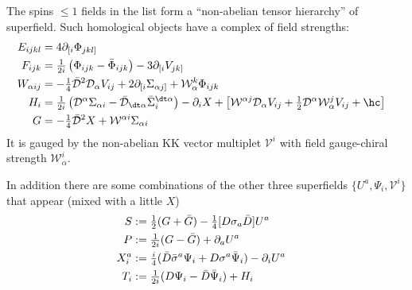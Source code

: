 \documentclass[letter,12pt]{article} %
\def\X{X}
\def\T{T}
\begin{document}
The spins $\leq 1$ fields in the list form a ``non-abelian tensor hierarchy'' of superfield.
Such homological objects have a complex of field strengths:
{%
\begin{align}
E_{ijkl} &= 4\partial_{[i} \Phi_{jkl]}
	\cr
F_{ijk} &= \tfrac1{2i}\left( \Phi_{ijk} - \bar \Phi_{ijk}\right) - 3\partial_{[i} V_{jk]}
	\cr
W_{\alpha ij} &= -\tfrac14 \bar {\mathcal D}^2 {\mathcal D}_\alpha V_{ij}
	+2\partial_{[i} \Sigma_{\alpha j]}
	+ \mathcal W_\alpha^k \Phi_{ijk}
	\cr
H_i &= \tfrac1{2i}\left({\mathcal D}^\alpha \Sigma_{\alpha i} - \bar {\mathcal D}_{\dt \alpha} \bar \Sigma_i^{\dt \alpha} \right)
	-\partial_i X 
	+\left[  \mathcal W^{\alpha j} {\mathcal D}_\alpha  V_{ij}
		+\tfrac12 {\mathcal D}^\alpha \mathcal W_\alpha^j   V_{ij}
	+\hc \right]
	\cr
G&= -\tfrac14 \bar {\mathcal D}^2 X 
	+ \mathcal W^{\alpha i} \Sigma_{\alpha	i}
\nonumber
\end{align}
}
It is gauged by the non-abelian KK vector multiplet $\mathcal V^i$ with field gauge-chiral strength $\mathcal W_\alpha^i$.

In addition there are some combinations of the other three superfields $\{U^a, \Psi_i, \mathcal V^i\}$ that appear (mixed with a little $X$)
{%
\begin{align}
S &:=\tfrac12(G+\bar G) -\tfrac14 [D \sigma_a \bar D] U^a
\cr
P &:=\tfrac 1{2i} (G-\bar G) + \partial_a U^a
\cr
\X_i^a &:= \tfrac i4 ( \bar D \bar \sigma^a \Psi_i+ D\sigma^a\bar \Psi_i ) - \partial_i U^a
\cr
\T_i &:= \tfrac1{2i} ( D\Psi_{i} - \bar D \bar \Psi_i) + H_i
\nonumber
\end{align}
}

\end{document}

